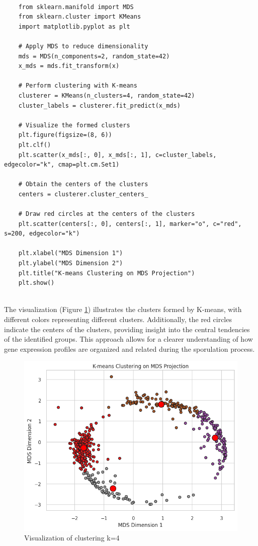 \documentclass{article}
\begin{document}
\begin{lstlisting}[style=mypython, label=fig:pca_code,caption=Clustering using MDS and k-Means]
	
	from sklearn.manifold import MDS
	from sklearn.cluster import KMeans
	import matplotlib.pyplot as plt
	
	# Apply MDS to reduce dimensionality
	mds = MDS(n_components=2, random_state=42)
	x_mds = mds.fit_transform(x)
	
	# Perform clustering with K-means
	clusterer = KMeans(n_clusters=4, random_state=42)
	cluster_labels = clusterer.fit_predict(x_mds)
	
	# Visualize the formed clusters
	plt.figure(figsize=(8, 6))
	plt.clf()
	plt.scatter(x_mds[:, 0], x_mds[:, 1], c=cluster_labels, edgecolor="k", cmap=plt.cm.Set1)
	
	# Obtain the centers of the clusters
	centers = clusterer.cluster_centers_
	
	# Draw red circles at the centers of the clusters
	plt.scatter(centers[:, 0], centers[:, 1], marker="o", c="red", s=200, edgecolor="k")
	
	plt.xlabel("MDS Dimension 1")
	plt.ylabel("MDS Dimension 2")
	plt.title("K-means Clustering on MDS Projection")
	plt.show()
	
\end{lstlisting}
The visualization (Figure \ref{fig:mds_k4}) illustrates the clusters formed by K-means, with different colors representing different clusters. Additionally, the red circles indicate the centers of the clusters, providing insight into the central tendencies of the identified groups. This approach allows for a clearer understanding of how gene expression profiles are organized and related during the sporulation process.
\begin{figure}[H]
	\centering
	\includegraphics[width=.6\textwidth]{images/mds_k4.png}
	\caption{Visualization of clustering k=4}
	\label{fig:mds_k4}
\end{figure}
\end{document}
